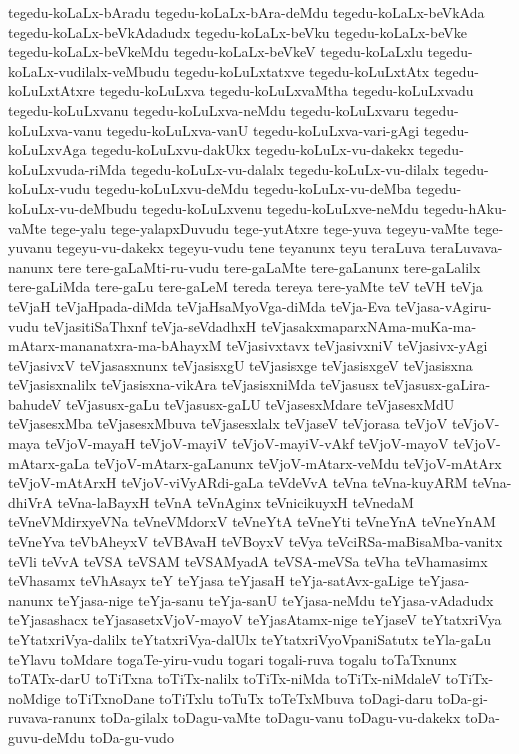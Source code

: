 {tegedu-koLaLx-bAradu
tegedu-koLaLx-bAra-deMdu
tegedu-koLaLx-beVkAda
tegedu-koLaLx-beVkAdadudx
tegedu-koLaLx-beVku
tegedu-koLaLx-beVke
tegedu-koLaLx-beVkeMdu
tegedu-koLaLx-beVkeV
tegedu-koLaLxlu
tegedu-koLaLx-vudilalx-veMbudu
tegedu-koLuLxtatxve
tegedu-koLuLxtAtx
tegedu-koLuLxtAtxre
tegedu-koLuLxva
tegedu-koLuLxvaMtha
tegedu-koLuLxvadu
tegedu-koLuLxvanu
tegedu-koLuLxva-neMdu
tegedu-koLuLxvaru
tegedu-koLuLxva-vanu
tegedu-koLuLxva-vanU
tegedu-koLuLxva-vari-gAgi
tegedu-koLuLxvAga
tegedu-koLuLxvu-dakUkx
tegedu-koLuLx-vu-dakekx
tegedu-koLuLxvuda-riMda
tegedu-koLuLx-vu-dalalx
tegedu-koLuLx-vu-dilalx
tegedu-koLuLx-vudu
tegedu-koLuLxvu-deMdu
tegedu-koLuLx-vu-deMba
tegedu-koLuLx-vu-deMbudu
tegedu-koLuLxvenu
tegedu-koLuLxve-neMdu
tegedu-hAku-vaMte
tege-yalu
tege-yalapxDuvudu
tege-yutAtxre
tege-yuva
tegeyu-vaMte
tege-yuvanu
tegeyu-vu-dakekx
tegeyu-vudu
tene
teyanunx
teyu
teraLuva
teraLuvava-nanunx
tere
tere-gaLaMti-ru-vudu
tere-gaLaMte
tere-gaLanunx
tere-gaLalilx
tere-gaLiMda
tere-gaLu
tere-gaLeM
tereda
tereya
tere-yaMte
teV
teVH
teVja
teVjaH
teVjaHpada-diMda
teVjaHsaMyoVga-diMda
teVja-Eva
teVjasa-vAgiru-vudu
teVjasitiSaThxnf
teVja-seVdadhxH
teVjasakxmaparxNAma-muKa-ma-mAtarx-mananatxra-ma-bAhayxM
teVjasivxtavx
teVjasivxniV
teVjasivx-yAgi
teVjasivxV
teVjasasxnunx
teVjasisxgU
teVjasisxge
teVjasisxgeV
teVjasisxna
teVjasisxnalilx
teVjasisxna-vikAra
teVjasisxniMda
teVjasusx
teVjasusx-gaLira-bahudeV
teVjasusx-gaLu
teVjasusx-gaLU
teVjasesxMdare
teVjasesxMdU
teVjasesxMba
teVjasesxMbuva
teVjasesxlalx
teVjaseV
teVjorasa
teVjoV
teVjoV-maya
teVjoV-mayaH
teVjoV-mayiV
teVjoV-mayiV-vAkf
teVjoV-mayoV
teVjoV-mAtarx-gaLa
teVjoV-mAtarx-gaLanunx
teVjoV-mAtarx-veMdu
teVjoV-mAtArx
teVjoV-mAtArxH
teVjoV-viVyARdi-gaLa
teVdeVvA
teVna
teVna-kuyARM
teVna-dhiVrA
teVna-laBayxH
teVnA
teVnAginx
teVnicikuyxH
teVnedaM
teVneVMdirxyeVNa
teVneVMdorxV
teVneYtA
teVneYti
teVneYnA
teVneYnAM
teVneYva
teVbAheyxV
teVBAvaH
teVBoyxV
teVya
teVciRSa-maBisaMba-vanitx
teVli
teVvA
teVSA
teVSAM
teVSAMyadA
teVSA-meVSa
teVha
teVhamasimx
teVhasamx
teVhAsayx
teY
teYjasa
teYjasaH
teYja-satAvx-gaLige
teYjasa-nanunx
teYjasa-nige
teYja-sanu
teYja-sanU
teYjasa-neMdu
teYjasa-vAdadudx
teYjasashacx
teYjasasetxVjoV-mayoV
teYjasAtamx-nige
teYjaseV
teYtatxriVya
teYtatxriVya-dalilx
teYtatxriVya-dalUlx
teYtatxriVyoVpaniSatutx
teYla-gaLu
teYlavu
toMdare
togaTe-yiru-vudu
togari
togali-ruva
togalu
toTaTxnunx
toTATx-darU
toTiTxna
toTiTx-nalilx
toTiTx-niMda
toTiTx-niMdaleV
toTiTx-noMdige
toTiTxnoDane
toTiTxlu
toTuTx
toTeTxMbuva
toDagi-daru
toDa-gi-ruvava-ranunx
toDa-gilalx
toDagu-vaMte
toDagu-vanu
toDagu-vu-dakekx
toDa-guvu-deMdu
toDa-gu-vudo
}
